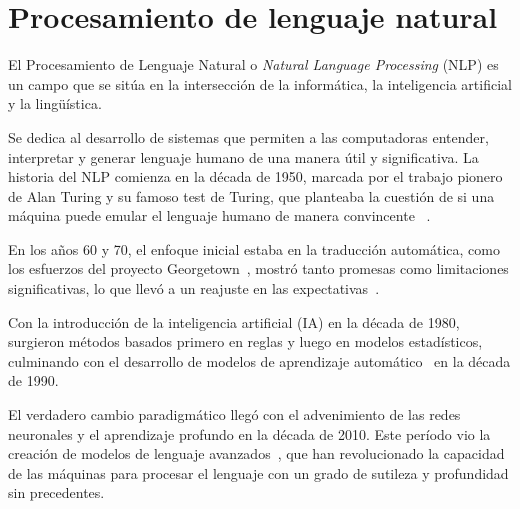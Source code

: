 \section{Procesamiento de lenguaje natural}

El Procesamiento de Lenguaje Natural o \textit{Natural Language Processing} (NLP) es un campo que se sitúa en la
intersección de la informática, la inteligencia artificial y la lingüística.

Se dedica al desarrollo de sistemas que permiten a las computadoras entender, interpretar y generar lenguaje humano de
una manera útil y significativa.
La historia del NLP comienza en la década de 1950, marcada por el trabajo pionero de Alan Turing y su famoso
test de Turing, que planteaba la cuestión de si una máquina puede emular el lenguaje humano de manera convincente
~\cite{article_touring_1950}.

En los años 60 y 70, el enfoque inicial estaba en la traducción automática, como los esfuerzos del proyecto
Georgetown~\cite{techreport_georgetown_1964}, mostró tanto promesas como limitaciones significativas, lo
que llevó a un reajuste en las expectativas~\cite{article_hutchins_2003}.

Con la introducción de la inteligencia artificial (IA) en la década de 1980, surgieron métodos basados primero en reglas
y luego en modelos estadísticos, culminando con el desarrollo de modelos de aprendizaje
automático~\cite{article_manning_1999} en la década de 1990.

El verdadero cambio paradigmático llegó con el advenimiento de las redes neuronales y el aprendizaje profundo en la
década de 2010.
Este período vio la creación de modelos de lenguaje avanzados~\cite{article_devlin_2019}, que han revolucionado la
capacidad de las máquinas para procesar el lenguaje con un grado de sutileza y profundidad sin precedentes.
